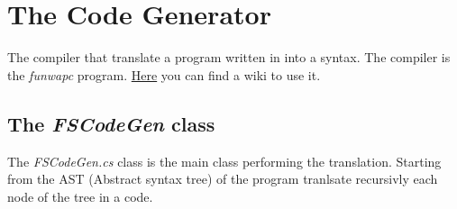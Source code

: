 
\chapter{\label{chapter4} The \fsharp Code Generator}

The compiler that translate a program written in \fwap into a \fsharp syntax. 
The compiler is the \textit{funwapc} program. \href{https://github.com/MCSN-project2014/APproject/wiki/How-to-use-the-Compiler}{Here} you can find a  wiki to  use it.

\section{The \textit{FSCodeGen} class}
The \textit{FSCodeGen.cs} class is the main class performing the translation.
Starting from the AST (Abstract syntax tree) of the program tranlsate recursivly each node of the tree in a \fsharp code.


